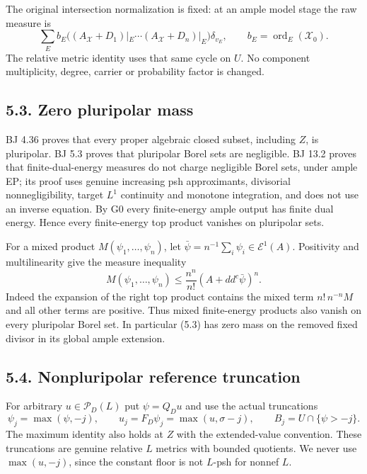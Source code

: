 \documentclass[
  10pt,
]{article}
\begin{document}
The original intersection normalization is fixed: at an ample model
stage the raw measure is \[
 \sum_E b_E\bigl((A_{\mathcal X}+D_1)|_E\cdots
                         (A_{\mathcal X}+D_n)|_E\bigr)\delta_{v_E},
                \qquad b_E=\operatorname{ord}_E(\mathcal X_0). \tag{5.4}
\] The relative metric identity uses that same cycle on \(U\). No
component multiplicity, degree, carrier or probability factor is
changed.

\subsection{5.3. Zero pluripolar mass}\label{zero-pluripolar-mass}

BJ 4.36 proves that every proper algebraic closed subset, including
\(Z\), is pluripolar. BJ 5.3 proves that pluripolar Borel sets are
negligible. BJ 13.2 proves that finite-dual-energy measures do not
charge negligible Borel sets, under ample EP; its proof uses genuine
increasing psh approximants, divisorial nonnegligibility, target \(L^1\)
continuity and monotone integration, and does not use an inverse
equation. By G0 every finite-energy ample output has finite dual energy.
Hence every finite-energy top product vanishes on pluripolar sets.

For a mixed product \(M(\psi_1,\ldots,\psi_n)\), let
\(\bar\psi=n^{-1}\sum_i\psi_i\in\mathcal E^1(A)\). Positivity and
multilinearity give the measure inequality \[
  M(\psi_1,\ldots,\psi_n)
       \leq \frac{n^n}{n!}(A+dd^c\bar\psi)^n.                 \tag{5.5}
\] Indeed the expansion of the right top product contains the mixed term
\(n!\,n^{-n}M\) and all other terms are positive. Thus mixed
finite-energy products also vanish on every pluripolar Borel set. In
particular (5.3) has zero mass on the removed fixed divisor in its
global ample extension.

\subsection{5.4. Nonpluripolar reference
truncation}\label{nonpluripolar-reference-truncation}

For arbitrary \(u\in\mathcal P_D(L)\) put \(\psi=Q_Du\) and use the
actual truncations \[
 \psi_j=\max(\psi,-j),\qquad
 u_j=F_D\psi_j=\max(u,\sigma-j),\qquad
                 B_j=U\cap\{\psi>-j\}.                      \tag{5.6}
\] The maximum identity also holds at \(Z\) with the extended-value
convention. These truncations are genuine relative \(L\) metrics with
bounded quotients. We never use \(\max(u,-j)\), since the constant floor
is not \(L\)-psh for nonnef \(L\).
\end{document}
